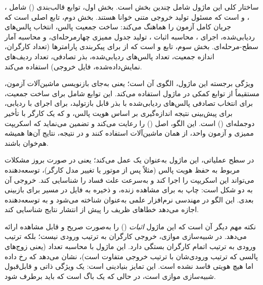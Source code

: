 ساختار کلی این ماژول شامل چندین بخش است. بخش اول، توابع قالب‌بندی () شامل ، ،  و  است که مسئول تولید خروجی متنی خوانا هستند. بخش دوم، تابع اصلی  است که جریان کامل آزمون را هماهنگ می‌کند: ساخت جمعیت پالس، انتخاب پالس‌های ردیابی‌شده، اجرای ، محاسبه اثبات ، تولید جدول ممیزی چهارمرحله‌ای، و محاسبه آمار سطح-مرحله‌ای. بخش سوم، تابع  و  است که از  برای پیکربندی پارامترها (تعداد کارگران، اندازه جمعیت، تعداد پالس‌های ردیابی‌شده، بذر تصادفی، تعداد ردیف‌های نمایش‌داده‌شده، فایل خروجی) استفاده می‌کند.

ویژگی برجسته این ماژول، الگوی  آن است؛ یعنی به‌جای بازنویسی ماشین‌آلات آزمون، مستقیماً از توابع کمکی در ماژول  استفاده می‌کند. این توابع شامل  برای ساخت جمعیت،  برای انتخاب تصادفی پالس‌های ردیابی‌شده با بذر قابل بازتولید،  برای اجرای  با ردیابی،  برای پیش‌بینی نتیجه اندازه‌گیری بر اساس هویت پالس، و  که یک کارگر با تأخیر دوجمله‌ای () است. این الگو، اصل  () را رعایت می‌کند و تضمین می‌نماید که اسکریپت ممیزی و آزمون واحد، از همان ماشین‌آلات استفاده کنند و در نتیجه، نتایج آن‌ها همیشه هم‌خوان باشند.

در سطح عملیاتی، این ماژول به‌عنوان یک  عمل می‌کند؛ یعنی در صورت بروز مشکلات مربوط به حفظ هویت پالس (مثلاً پس از  موتور  یا تغییر مدل کارگر)، توسعه‌دهنده می‌تواند این اسکریپت را اجرا کند و به‌سرعت علت فساد را شناسایی کند. خروجی آن به دو شکل است: چاپ به  برای مشاهده زنده، و ذخیره به فایل  در مسیر  برای بازبینی بعدی. این الگو در مهندسی نرم‌افزار علمی به‌عنوان  شناخته می‌شود و به توسعه‌دهنده اجازه می‌دهد خطاهای ظریف را پیش از انتشار نتایج شناسایی کند.

نکته مهم دیگر آن است که این ماژول \emph{اثبات } () را به‌صورت صریح و قابل مشاهده ارائه می‌دهد. در شبیه‌سازی موازی، خروجی کارگران به ترتیب ورودی نیست؛ بلکه ترتیب ورودی به ترتیب اتمام کارگران بستگی دارد. این ماژول با محاسبه تعداد  (یعنی زوج‌های پالسی که ترتیب ورودی‌شان با ترتیب خروجی متفاوت است)، نشان می‌دهد که  رخ داده اما هیچ هویتی فاسد نشده است. این تمایز بنیادینی است:  یک ویژگی ذاتی و قابل‌قبول شبیه‌سازی موازی است، در حالی که  یک باگ است که باید برطرف شود.

